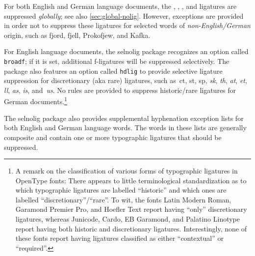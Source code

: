 \documentclass[11pt]{article}
\newcommand{\pkg}[1]{\textsf{#1}}
\newcommand{\opt}[1]{\texttt{#1}}
\begin{document}
For both English and German language documents, the {\ebg {}, , , and } ligatures are suppressed \emph{globally}; see also \cref{sec:global-nolig}. However, exceptions are provided in order not to suppress these ligatures for selected words of \emph{non-English\slash German} origin, such as {\ebg fjord, fjell, Prokofjew, and Kafka}.

For English language documents, the \pkg{selnolig} package recognizes an option called \opt{broadf}; if it is set, additional f-ligatures will be suppressed selectively. The package also features an option called \opt{hdlig} to provide selective ligature suppression for discretionary (aka rare) ligatures, such as~ct, st, sp, {\ebg\emph{sk}}, \emph{th}, \emph{at}, \emph{et}, \emph{ll}, \emph{as}, \emph{is}, and~\emph{us}. No rules are provided to suppress historic\slash rare ligatures for German documents.\footnote{A remark on the classification of various forms of typographic ligatures in OpenType fonts: There appears to little terminological standardization as to which typographic ligatures are labelled \enquote{historic} and which ones are labelled \enquote{discretionary}\slash\enquote{rare}. To wit, the fonts Latin Modern Roman, Garamond Premier Pro, and Hoefler Text report having \enquote{only} discretionary ligatures, whereas Junicode, Cardo, EB Garamond, and Palatino Linotype report having both historic and discretionary ligatures. Interestingly, none of these fonts report having ligatures classified as either \enquote{contextual} or \enquote{required}. }

The \pkg{selnolig} package also provides supplemental hyphenation exception lists for both English and German language words. The words in these lists are generally composite and contain one or more typographic ligatures that should be suppressed.
\end{document}
